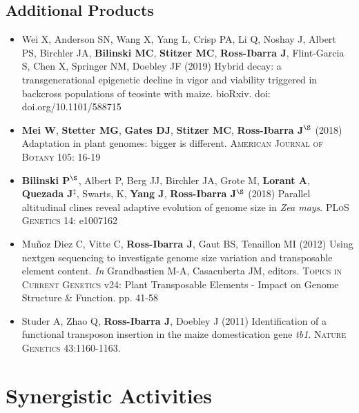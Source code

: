 \documentclass[10pt]{article}
\begin{document}
\subsection*{Additional Products}

\begin{itemize} \setlength{\itemsep}{0pt} \setlength{\parskip}{2pt} \setlength{\parsep}{0pt}

\item Wei X,  Anderson SN,  Wang X,  Yang L, Crisp PA,  Li Q,  Noshay J, Albert PS, Birchler JA,  \textbf{Bilinski MC}, \textbf{Stitzer MC}, \textbf{Ross-Ibarra J},  Flint-Garcia S,  Chen X,  Springer NM, Doebley JF (2019) Hybrid decay: a transgenerational epigenetic decline in vigor and viability triggered in backcross populations of teosinte with maize. bioRxiv. doi: doi.org/10.1101/588715

\item {\bf Mei W}, {\bf Stetter MG}, {\bf Gates DJ}, {\bf Stitzer MC}, {\bf Ross-Ibarra J}$^\S$ (2018) Adaptation in plant genomes: bigger is different.  \textsc{American Journal of Botany} 105: 16-19

\item \textbf{Bilinski P}$^\S$, Albert P, Berg JJ, Birchler JA, Grote M, \textbf{Lorant A}, \textbf{Quezada J}$^\ddagger$, Swarts, K, \textbf{Yang J}, \textbf{Ross-Ibarra J}$^\S$ (2018) Parallel altitudinal clines reveal adaptive evolution of genome size in \textit{Zea mays}. \textsc{PLoS Genetics} 14: e1007162

\item Mu\~{n}oz Diez C, Vitte C, {\bf Ross-Ibarra J}, Gaut BS, Tenaillon MI (2012) Using nextgen sequencing to investigate genome size variation and transposable element content. \emph{In} Grandbastien M-A, Casacuberta JM, editors. \textsc{Topics in Current Genetics} v24: Plant Transposable Elements - Impact on Genome Structure \& Function. pp. 41-58

\item Studer A, Zhao Q, {\bf Ross-Ibarra J}, Doebley J (2011) Identification of a functional transposon insertion in the maize domestication gene \emph{tb1}.  \textsc{Nature Genetics} 43:1160-1163.

\end{itemize}

\section{Synergistic Activities}
\end{document}
